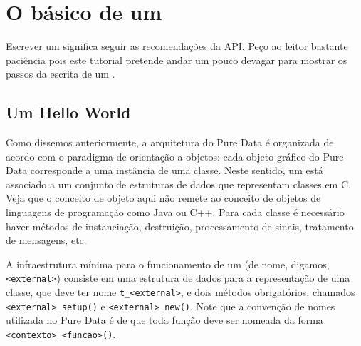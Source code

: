 
\chapter{O básico de um \external}
\label{sec:basico}


Escrever um \external significa seguir as recomendações da API. Peço ao leitor
bastante paciência pois este tutorial pretende andar um pouco devagar para
mostrar os passos da escrita de um \external.


\section{Um \external Hello World}

Como dissemos anteriormente, a arquitetura do Pure Data é organizada de acordo
com o paradigma de orientação a objetos: cada objeto gráfico do Pure Data
corresponde a uma instância de uma classe. Neste sentido, um \external está
associado a um conjunto de estruturas de dados que representam classes em C.
Veja que o conceito de objeto aqui não remete ao conceito de objetos de
linguagens de programação como Java ou C++.
Para cada classe é necessário haver métodos de instanciação, destruição,
processamento de sinais, tratamento de mensagens, etc.

A infraestrutura mínima para o funcionamento de um \external (de nome, digamos,
\texttt{<external>}) consiste em uma estrutura de dados para a representação
de uma classe, que deve ter nome \texttt{t\_<external>}, e dois métodos
obrigatórios, chamados \texttt{<external>\_setup()} e
\texttt{<external>\_new()}. Note que a convenção de nomes utilizada no Pure
Data é de que toda função deve ser nomeada da forma
\texttt{<contexto>\_<funcao>()}.

